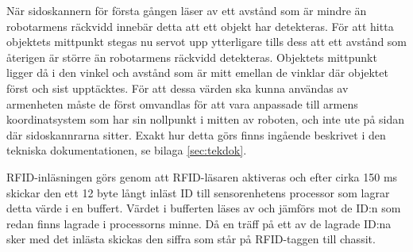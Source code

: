 När sidoskannern för första gången läser av ett avstånd som är mindre än robotarmens räckvidd innebär detta att ett objekt har detekteras. För att hitta objektets mittpunkt stegas nu servot upp ytterligare tills dess att ett avstånd som återigen är större än robotarmens räckvidd detekteras. Objektets mittpunkt ligger då i den vinkel och avstånd som är mitt emellan de vinklar där objektet först och sist upptäcktes. För att dessa värden ska kunna användas av armenheten måste de först omvandlas för att vara anpassade till armens koordinatsystem som har sin nollpunkt i mitten av roboten, och inte ute på sidan där sidoskannrarna sitter. Exakt hur detta görs finns ingående beskrivet i den tekniska dokumentationen, se bilaga \ref{sec:tekdok}.

RFID-inläsningen görs genom att RFID-läsaren aktiveras och efter cirka 150 ms skickar den ett 12 byte långt inläst ID till sensorenhetens processor som lagrar detta värde i en buffert. Värdet i bufferten läses av och jämförs mot de ID:n som redan finns lagrade i processorns minne. Då en träff på ett av de lagrade ID:na sker med det inlästa skickas den siffra som står på RFID-taggen till chassit. 




